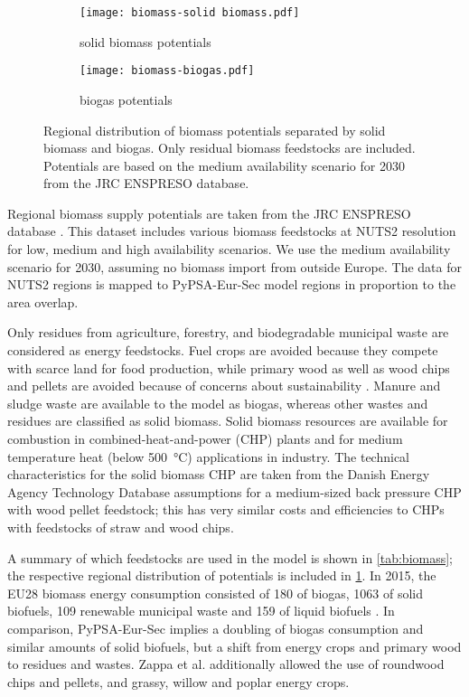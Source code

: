 \begin{figure}
    \centering
    \begin{subfigure}[t]{0.49\textwidth}
        \centering
        \caption{solid biomass potentials}
        \texttt{[image: biomass-solid biomass.pdf]}
    \end{subfigure}
    \begin{subfigure}[t]{0.49\textwidth}
        \centering
        \caption{biogas potentials}
        \texttt{[image: biomass-biogas.pdf]}
    \end{subfigure}
    \caption{Regional distribution of biomass potentials separated by solid biomass and biogas. Only residual biomass feedstocks are included. Potentials are based on the medium availability scenario for 2030 from the JRC ENSPRESO database.}
    \label{fig:biomass-potentials}
\end{figure}

Regional biomass supply potentials are taken from the JRC ENSPRESO database
. This dataset includes various biomass feedstocks at
NUTS2 resolution for low, medium and high availability scenarios.  We use the
medium availability scenario for 2030, assuming no biomass import from outside
Europe. The data for NUTS2 regions is mapped to PyPSA-Eur-Sec model regions in
proportion to the area overlap.

Only residues from agriculture, forestry, and biodegradable municipal
waste are considered as energy feedstocks. Fuel crops are avoided because they
compete with scarce land for food production, while primary wood as well as wood
chips and pellets are avoided because of concerns about sustainability
.
Manure and sludge waste are available to the model as biogas, whereas other
wastes and residues are classified as solid biomass. Solid biomass resources are
available for combustion in combined-heat-and-power (CHP) plants and for medium
temperature heat (below \SI{500}{\celsius}) applications in industry.
The technical characteristics for the solid biomass CHP are taken from the
Danish Energy Agency Technology Database  assumptions for a
medium-sized back pressure CHP with wood pellet feedstock; this has very similar
costs and efficiencies to CHPs with feedstocks of straw and wood chips.

A summary of which feedstocks are used in the model is shown in
\cref{tab:biomass}; the respective regional distribution of potentials is
included in \cref{fig:biomass-potentials}. In 2015, the EU28 biomass energy
consumption consisted of \SI{180}{\twh} of biogas, \SI{1063}{\twh} of solid
biofuels, \SI{109}{\twh} renewable municipal waste and \SI{159}{\twh} of liquid
biofuels . In comparison, PyPSA-Eur-Sec implies a doubling of biogas
consumption and similar amounts of solid biofuels, but a shift from energy crops
and primary wood to residues and wastes. Zappa et al.
 additionally allowed the use of roundwood chips
and pellets, and grassy, willow and poplar energy crops.

